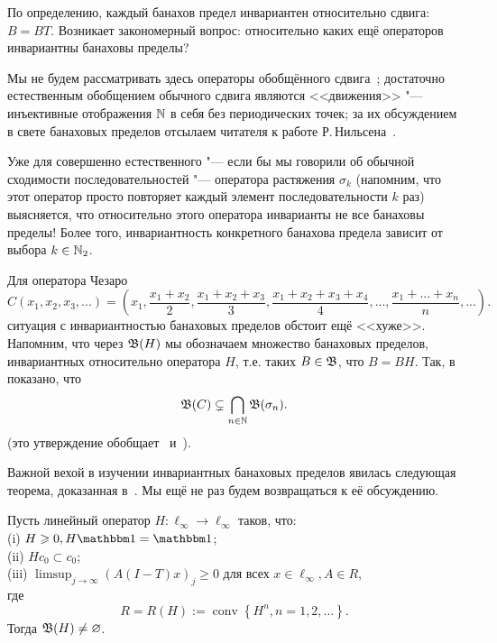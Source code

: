 По определению, каждый банахов предел инвариантен относительно сдвига: $B=BT$.
Возникает закономерный вопрос: относительно каких ещё операторов инвариантны банаховы пределы?

Мы не будем рассматривать здесь операторы обобщённого сдвига~\cite{marchenko2006generalized,lewitan1945normed};
достаточно естественным обобщением обычного сдвига являются <<движения>> "--- инъективные отображения $\mathbb{N}$ в себя без периодических точек; за их обсуждением в свете банаховых пределов отсылаем читателя к работе Р.\,Нильсена~\cite{Nillsen}.

Уже для совершенно естественного "--- если бы мы говорили об обычной сходимости последовательностей "---
оператора растяжения $\sigma_k$
(напомним, что этот оператор просто повторяет каждый элемент последовательности $k$ раз)
выясняется, что относительно этого оператора инварианты не все банаховы пределы!
Более того, инвариантность конкретного банахова предела зависит от выбора $k\in\mathbb{N}_2$.

Для оператора Чезаро
\begin{equation}
	C (x_1, x_2, x_3, ...) = \left(
	x_1,
	\dfrac{x_1+x_2}2,
	\dfrac{x_1+x_2 + x_3}3,
	\dfrac{x_1+x_2+x_3+x_4}4,
	...,
	\dfrac{x_1+...+x_n}n,
	...\right)
	.
\end{equation}
ситуация с инвариантностью банаховых пределов обстоит ещё <<хуже>>.
Напомним, что через $\mathfrak{B}(H)$ мы обозначаем множество банаховых пределов,
инвариантных относительно оператора $H$,
т.е. таких $B\in \mathfrak{B}$, что $B=BH$.
Так, в~\cite[\S2, Theorem 4]{semenov2020dilation} показано, что
\begin{equation}
	\label{eq:B_C_subsetneq_B_sigma_n}
	\B(C) \subsetneq \bigcap_{n\in \N}\B(\sigma_n)
	.
\end{equation}
(это утверждение обобщает~\cite[Theorem 3]{semenov2020invariant_noncommutative}
и~\cite[Theorem 4.8]{ASSU4}).

Важной вехой в изучении инвариантных банаховых пределов явилась следующая теорема,
доказанная в~\cite[\S2]{Semenov2010invariant}.
Мы ещё не раз будем возвращаться к её обсуждению.

\begin{theorem}
	\label{thm:Semenov_Sukochev_conditions}
	Пусть линейный оператор $H:\ell_\infty\to\ell_\infty$ таков, что:
	\\(i)   $H \geqslant 0, H \one=\one$;
	\\(ii)  $H c_0 \subset c_0$;
	\\(iii) $\limsup _{j \rightarrow \infty}(A(I-T) x)_j \geqslant 0$ для всех $x \in \ell_{\infty}, A \in R$,
	\\где
	\begin{equation}
		R=R(H):=\operatorname{conv}\left\{H^n, n=1,2, \ldots\right\}
		.
	\end{equation}
	Тогда $\mathfrak{B}(H) \ne\varnothing$.
\end{theorem}

